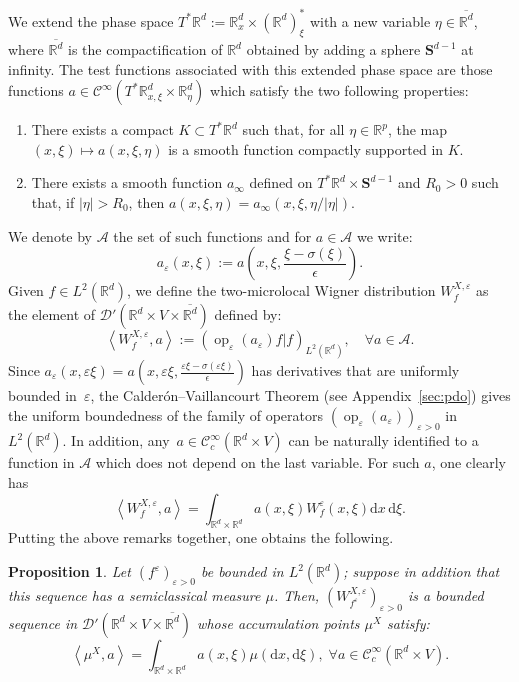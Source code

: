 \documentclass[10pt]{amsart}
\newtheorem{prop}[cdrthm]{Proposition}
\theoremstyle{definition}
\DeclareMathOperator{\op}{op}
\newcommand*\R{{\mathbb R}}
\newcommand*\eps{\varepsilon}
\numberwithin{equation}{section}
\let\oldforall\forall
\renewcommand*{\forall}{\mathrel{\oldforall}}
\newcommand*{\dd}{\mathrm{d}}
\newcommand*{\dx}{\dd x}
\newcommand*{\dxi}{\dd \xi}
\begin{document}
We extend the phase space $T^*\R^d:=\R^d_x\times(\R^d)^*_\xi$ with a new variable $\eta\in \overline{ \R^d}$, where $\overline{\R^d}$ is the compactification of $\R^d$ obtained by adding a sphere $\mathbf{S}^{d-1}$ at infinity. The test functions associated with this extended phase space are those functions $a\in{\mathcal C}^\infty(T^*\R^d_{x,\xi}\times\R^d_\eta)$ which satisfy the two following properties:
\begin{enumerate}
\item \label{listsec4.1} There exists a compact $K \subset T^*\R^d$ such that, for all $\eta\in\R^p$, the map $(x,\xi)\mapsto a(x,\xi,\eta)$ is a smooth function compactly supported in $K$.
\item \label{listsec4.2}There exists a smooth function $a_\infty$ defined on $T^*\R^d\times\mathbf{S}^{d-1}$ and $R_0>0$ such that, if $|\eta|>R_0$, then $a(x,\xi,\eta)=a_\infty(x,\xi,\eta/|\eta|)$.
\end{enumerate}


We denote by $\mathcal{A}$ the set of such functions and for $a\in \mathcal{A}$ we write:
\begin{equation}\label{def:aeps}
a_\eps(x,\xi):=a\left(x,\xi,\frac{\xi-\sigma(\xi)}{\epsilon}\right).
\end{equation}
Given $f\in L^2(\R^d)$, we define the two-microlocal Wigner distribution $W^{X,\eps}_{f}$ as the element of $\mathcal{D}'(\R^d\times V\times \overline{\R^d})$ defined by:
\begin{equation}
\left\langle W^{X,\eps}_{f},a\right\rangle :=(\op_\eps(a_\eps) f|f)_{L^2(\R^d)},\quad \forall a\in {\mathcal A}.
\end{equation}
Since $a_\eps(x,\eps\xi) = a\left(x,\eps \xi,\frac{\eps \xi-\sigma(\eps\xi)}{\epsilon}\right)$ has derivatives that are uniformly bounded in~$\eps$, the Calderón--Vaillancourt Theorem (see Appendix~\ref{sec:pdo}) gives the uniform boundedness of the family of operators $(\op_\eps(a_\eps))_{\eps>0}$ in $L^2(\R^d)$. In addition, any~$a\in {\mathcal C}^\infty_c(\R^d\times V)$ can be naturally identified to a function in ${\mathcal A}$ which does not depend on the last variable. For such $a$, one clearly has
\[
\left\langle W^{X,\eps}_{f},a\right\rangle=\int_{\R^d\times\R^d}a(x,\xi)W^\eps_f(x,\xi)\dx\,\dxi.
\]
Putting the above remarks together, one obtains the following.

\begin{prop}\label{prop:2microdis}
Let $(f^\eps)_{\eps>0}$ be bounded in $L^2(\R^d)$; suppose in addition that this sequence has a semiclassical measure $\mu$. Then, $(W^{X,\eps}_{f^\eps})_{\eps>0}$ is a bounded sequence in $\mathcal{D}'(\R^d\times V\times \overline{\R^d})$ whose accumulation points $\mu^X$ satisfy:
\[
\left\langle \mu^{X},a\right\rangle=\int_{\R^d\times\R^d}a(x,\xi)\mu(\dx,\dxi),\;\forall a\in {\mathcal C}^\infty_c(\R^d\times V).
\]
\end{prop}
\end{document}
